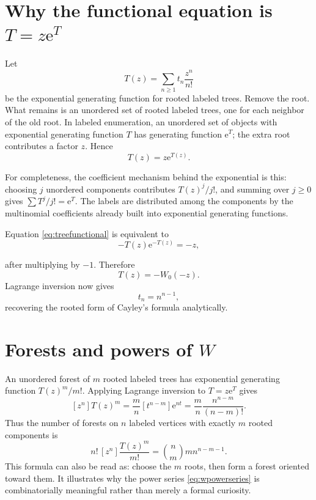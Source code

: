 \documentclass[11pt,openany]{book}
\newcommand{\e}{\mathrm{e}}
\theoremstyle{plain}
\theoremstyle{definition}
\theoremstyle{remark}
\begin{document}
\section{Why the functional equation is \texorpdfstring{\(T=z\e^T\)}{T=z exp(T)}}
Let
\[
       T(z)=\sum_{n\ge1}t_n\frac{z^n}{n!}
\]
be the exponential generating function for rooted labeled trees.  Remove the
root.  What remains is an unordered set of rooted labeled trees, one for each
neighbor of the old root.  In labeled enumeration, an unordered set of
objects with exponential generating function \(T\) has generating function
\(\e^T\); the extra root contributes a factor \(z\).  Hence
\begin{equation}\label{eq:treefunctional}
               T(z)=z\e^{T(z)}.
\end{equation}

For completeness, the coefficient mechanism behind the exponential is this:
choosing \(j\) unordered components contributes \(T(z)^j/j!\), and summing
over \(j\ge0\) gives \(\sum T^j/j!=\e^T\).  The labels are distributed among
the components by the multinomial coefficients already built into
exponential generating functions.

Equation \eqref{eq:treefunctional} is equivalent to
\[
        -T(z)\e^{-T(z)}=-z,
\]

after multiplying by \(-1\).  Therefore
\begin{equation}\label{eq:treeW}
               T(z)=-W_0(-z).
\end{equation}
Lagrange inversion now gives
\[
        t_n=n^{n-1},
\]
recovering the rooted form of Cayley's formula analytically.

\section{Forests and powers of \texorpdfstring{\(W\)}{W}}
An unordered forest of \(m\) rooted labeled trees has exponential generating
function \(T(z)^m/m!\).  Applying Lagrange inversion to
\(T=z\e^T\) gives
\[
 [z^n]T(z)^m
 =\frac mn[t^{n-m}]\e^{nt}
 =\frac mn\frac{n^{n-m}}{(n-m)!}.
\]
Thus the number of forests on \(n\) labeled vertices with exactly \(m\)
rooted components is
\begin{equation}\label{eq:forestcount}
 n!\,[z^n]\frac{T(z)^m}{m!}
 =\binom{n}{m}m n^{n-m-1}.
\end{equation}
This formula can also be read as: choose the \(m\) roots, then form a forest
oriented toward them.  It illustrates why the power series
\eqref{eq:wpowerseries} is combinatorially meaningful rather than merely a
formal curiosity.
\end{document}
